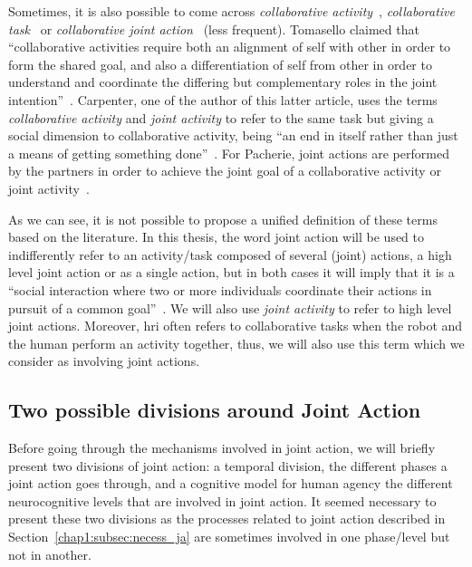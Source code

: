 \documentclass[a4paper,11pt,twoside]{StyleThese}
\begin{document}
Sometimes, it is also possible to come across \emph{collaborative activity}~\cite{tomasello_2005_understanding}, \emph{collaborative task}~\cite{brennan_2008_coordinating} or \emph{collaborative joint action}~\cite{godman_2013_we} (less frequent). Tomasello \etal{} claimed that ``collaborative activities require both an alignment of self with other in order to form the shared goal, and also a differentiation of self from other in order to understand and coordinate the differing but complementary roles in the joint intention''~\cite[p.~681]{tomasello_2005_understanding}. Carpenter, one of the author of this latter article, uses the terms \emph{collaborative activity} and \emph{joint activity} to refer to the same task but giving a social dimension to collaborative activity, being ``an end in itself rather than just a means of getting something done''~\cite[p.~384]{carpenter_2009_just}. For Pacherie, joint actions are performed by the partners in order to achieve the joint goal of a collaborative activity or joint activity~\cite{pacherie_2013_intentional}.

As we can see, it is not possible to propose a unified definition of these terms based on the literature. In this thesis, the word joint action will be used to indifferently refer to an activity/task composed of several (joint) actions, \ie a high level joint action or as a single action, but in both cases it will imply that it is a ``social interaction where two or more individuals coordinate their actions in pursuit of a common goal''~\cite{castro_2020_joint}. We will also use \textit{joint activity} to refer to high level joint actions. Moreover, \acrshort{hri} often refers to collaborative tasks when the robot and the human perform an activity together, thus, we will also use this term which we consider as involving joint actions.

\subsection{Two possible divisions around Joint Action}

Before going through the mechanisms involved in joint action, we will briefly present two divisions of joint action: a temporal division, \ie the different phases a joint action goes through, and a cognitive model for human agency \ie the different neurocognitive levels that are involved in joint action. It seemed necessary to present these two divisions as the processes related to joint action described in Section~\ref{chap1:subsec:necess_ja} are sometimes involved in one phase/level but not in another. 
\end{document}
